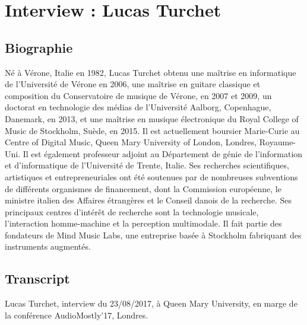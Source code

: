 \chapter{Interview : Lucas Turchet}
\label{appendix:turchet}

\section*{Biographie}
\noindent Né à Vérone, Italie en 1982, Lucas Turchet obtenu une maîtrise en informatique de l'Université de Vérone en 2006, une maîtrise en guitare classique et composition du Conservatoire de musique de Vérone, en 2007 et 2009, un doctorat en technologie des médias de l'Université Aalborg, Copenhague, Danemark, en 2013, et une maîtrise en musique électronique du Royal College of Music de Stockholm, Suède, en 2015. Il est actuellement boursier Marie-Curie au Centre of Digital Music, Queen Mary University of London, Londres, Royaume-Uni. Il est également professeur adjoint au Département de génie de l'information et d'informatique de l'Université de Trente, Italie. Ses recherches scientifiques, artistiques et entrepreneuriales ont été soutenues par de nombreuses subventions de différents organismes de financement, dont la Commission européenne, le ministre italien des Affaires étrangères et le Conseil danois de la recherche. Ses principaux centres d'intérêt de recherche sont la technologie musicale, l'interaction homme-machine et la perception multimodale. Il fait partie des fondateurs de Mind Music Labs, une entreprise basée à Stockholm fabriquant des instruments augmentés.

\section*{Transcript}

\noindent Lucas Turchet, interview du 23/08/2017, à Queen Mary University, en marge de la conférence AudioMostly'17, Londres.

